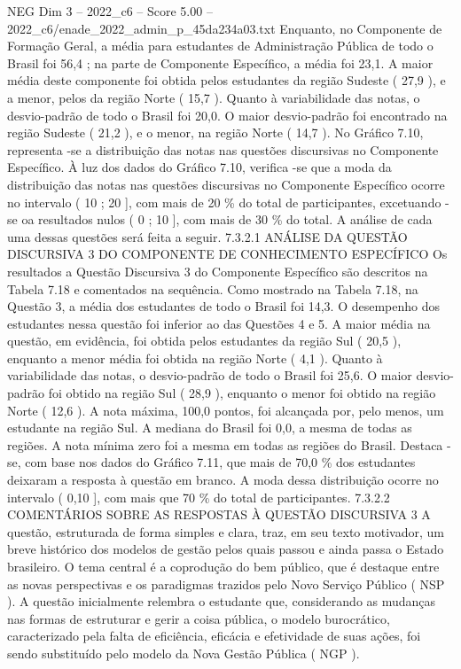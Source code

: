 \begin{textsample}{NEG Dim 3 – 2022\_c6 – Score 5.00 – 2022\_c6/enade\_2022\_admin\_p\_45da234a03.txt}
Enquanto, no Componente de Formação Geral, a média para estudantes de Administração Pública de todo o Brasil foi 56,4 ; na parte de Componente Específico, a média foi 23,1.
A maior média deste componente foi obtida pelos estudantes da região Sudeste ( 27,9 ), e a menor, pelos da região Norte ( 15,7 ).
Quanto à variabilidade das notas, o desvio-padrão de todo o Brasil foi 20,0.
O maior desvio-padrão foi encontrado na região Sudeste ( 21,2 ), e o menor, na região Norte ( 14,7 ).
No Gráfico 7.10, representa -se a distribuição das notas nas questões discursivas no Componente Específico.
À luz dos dados do Gráfico 7.10, verifica -se que a moda da distribuição das notas nas questões discursivas no Componente Específico ocorre no intervalo ( 10 ; 20 ], com mais de 20 \% do total de participantes, excetuando -se oa resultados nulos ( 0 ; 10 ], com mais de 30 \% do total.
A análise de cada uma dessas questões será feita a seguir. 7.3.2.1 ANÁLISE DA QUESTÃO DISCURSIVA 3 DO COMPONENTE DE CONHECIMENTO ESPECÍFICO Os resultados a Questão Discursiva 3 do Componente Específico são descritos na Tabela 7.18 e comentados na sequência.
Como mostrado na Tabela 7.18, na Questão 3, a média dos estudantes de todo o Brasil foi 14,3.
O desempenho dos estudantes nessa questão foi inferior ao das Questões 4 e 5.
A maior média na questão, em evidência, foi obtida pelos estudantes da região Sul ( 20,5 ), enquanto a menor média foi obtida na região Norte ( 4,1 ).
Quanto à variabilidade das notas, o desvio-padrão de todo o Brasil foi 25,6.
O maior desvio-padrão foi obtido na região Sul ( 28,9 ), enquanto o menor foi obtido na região Norte ( 12,6 ).
A nota máxima, 100,0 pontos, foi alcançada por, pelo menos, um estudante na região Sul.
A mediana do Brasil foi 0,0, a mesma de todas as regiões.
A nota mínima zero foi a mesma em todas as regiões do Brasil.
Destaca -se, com base nos dados do Gráfico 7.11, que mais de 70,0 \% dos estudantes deixaram a resposta à questão em branco.
A moda dessa distribuição ocorre no intervalo ( 0,10 ], com mais que 70 \% do total de participantes. 7.3.2.2 COMENTÁRIOS SOBRE AS RESPOSTAS À QUESTÃO DISCURSIVA 3 A questão, estruturada de forma simples e clara, traz, em seu texto motivador, um breve histórico dos modelos de gestão pelos quais passou e ainda passa o Estado brasileiro.
O tema central é a coprodução do bem público, que é destaque entre as novas perspectivas e os paradigmas trazidos pelo Novo Serviço Público ( NSP ).
A questão inicialmente relembra o estudante que, considerando as mudanças nas formas de estruturar e gerir a coisa pública, o modelo burocrático, caracterizado pela falta de eficiência, eficácia e efetividade de suas ações, foi sendo substituído pelo modelo da Nova Gestão Pública ( NGP ).

\end{textsample}

